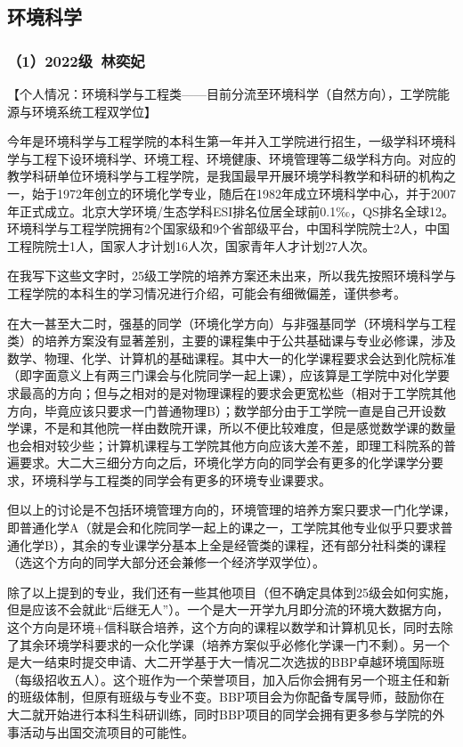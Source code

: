 \documentclass[11pt,oneside]{book}
\begin{document}
\subsection{环境科学}

\subsubsection{（1）2022级\ 林奕妃}

【个人情况：环境科学与工程类——目前分流至环境科学（自然方向），工学院能源与环境系统工程双学位】

今年是环境科学与工程学院的本科生第一年并入工学院进行招生，一级学科环境科学与工程下设环境科学、环境工程、环境健康、环境管理等二级学科方向。对应的教学科研单位环境科学与工程学院，是我国最早开展环境学科教学和科研的机构之一，始于1972年创立的环境化学专业，随后在1982年成立环境科学中心，并于2007年正式成立。北京大学环境/生态学科ESI排名位居全球前0.1‰，QS排名全球12。环境科学与工程学院拥有2个国家级和9个省部级平台，中国科学院院士2人，中国工程院院士1人，国家人才计划16人次，国家青年人才计划27人次。

在我写下这些文字时，25级工学院的培养方案还未出来，所以我先按照环境科学与工程学院的本科生的学习情况进行介绍，可能会有细微偏差，谨供参考。

在大一甚至大二时，强基的同学（环境化学方向）与非强基同学（环境科学与工程类）的培养方案没有显著差别，主要的课程集中于公共基础课与专业必修课，涉及数学、物理、化学、计算机的基础课程。其中大一的化学课程要求会达到化院标准（即字面意义上有两三门课会与化院同学一起上课），应该算是工学院中对化学要求最高的方向；但与之相对的是对物理课程的要求会更宽松些（相对于工学院其他方向，毕竟应该只要求一门普通物理B）；数学部分由于工学院一直是自己开设数学课，不是和其他院一样由数院开课，所以不便比较难度，但是感觉数学课的数量也会相对较少些；计算机课程与工学院其他方向应该大差不差，即理工科院系的普遍要求。大二大三细分方向之后，环境化学方向的同学会有更多的化学课学分要求，环境科学与工程类的同学会有更多的环境专业课要求。

但以上的讨论是不包括环境管理方向的，环境管理的培养方案只要求一门化学课，即普通化学A（就是会和化院同学一起上的课之一，工学院其他专业似乎只要求普通化学B），其余的专业课学分基本上全是经管类的课程，还有部分社科类的课程（选这个方向的同学大部分还会兼修一个经济学双学位）。

除了以上提到的专业，我们还有一些其他项目（但不确定具体到25级会如何实施，但是应该不会就此“后继无人”）。一个是大一开学九月即分流的环境大数据方向，这个方向是环境+信科联合培养，这个方向的课程以数学和计算机见长，同时去除了其余环境学科要求的一众化学课（培养方案似乎必修化学课一门不剩）。另一个是大一结束时提交申请、大二开学基于大一情况二次选拔的BBP卓越环境国际班（每级招收五人）。这个班作为一个荣誉项目，加入后你会拥有另一个班主任和新的班级体制，但原有班级与专业不变。BBP项目会为你配备专属导师，鼓励你在大二就开始进行本科生科研训练，同时BBP项目的同学会拥有更多参与学院的外事活动与出国交流项目的可能性。
\end{document}
